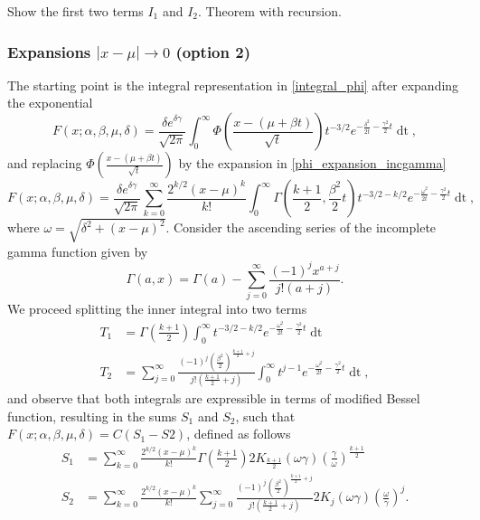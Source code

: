 \documentclass[10pt,a4paper,oneside]{article}
\numberwithin{equation}{section}
\begin{document}
Show the first two terms $I_1$ and $I_2$. Theorem with recursion.

\subsubsection{Expansions $|x-\mu| \to 0$ (option 2)}
The starting point is the integral representation in \eqref{integral_phi} after expanding the exponential
\begin{equation*}
F(x;\alpha, \beta, \mu, \delta) = \frac{\delta e^{\delta \gamma}}{\sqrt{2\pi}} \int_{0}^{\infty} \Phi\left(\frac{x - (\mu +\beta t)}{\sqrt{t}}\right) t^{-3/2} e^{-\frac{\delta^2}{2t} - \frac{\gamma^2}{2}t} \mathop{dt},
\end{equation*}
and replacing $\Phi\left(\frac{x - (\mu +\beta t)}{\sqrt{t}}\right)$ by the expansion in \eqref{phi_expansion_incgamma}
\begin{equation*}
F(x;\alpha, \beta, \mu, \delta) = \frac{\delta e^{\delta \gamma}}{\sqrt{2\pi}} \sum_{k=0}^{\infty}\frac{2^{k/2}(x-\mu)^k}{k!}\int_0^{\infty}\Gamma\left(\frac{k+1}{2}, \frac{\beta^2}{2}t\right) t^{-3/2-k/2} e^{-\frac{\omega^2}{2t} - \frac{\gamma^2}{2}t} \mathop{dt},
\end{equation*}
where $\omega = \sqrt{\delta^2 + (x-\mu)^2}$. Consider the ascending series of the incomplete gamma function given by \cite[\S 8.7]{NIST:DLMF}
\begin{equation}
\Gamma(a, x) = \Gamma(a) - \sum_{j=0}^{\infty} \frac{(-1)^j x^{a+j}}{j! (a+ j)}.
\end{equation}
We proceed splitting the inner integral into two terms
\begin{align}
T_1 &= \Gamma\left(\frac{k+1}{2}\right)\int_0^{\infty}t^{-3/2-k/2} e^{-\frac{\omega^2}{2t} - \frac{\gamma^2}{2}t} \mathop{dt}\\
T_2 &= \sum_{j=0}^{\infty} \frac{(-1)^j \left(\frac{\beta^2}{2}\right)^{\frac{k+1}{2}+j}}{j! (\frac{k+1}{2}+ j)}\int_0^{\infty} t^{j-1} e^{-\frac{\omega^2}{2t} - \frac{\gamma^2}{2}t} \mathop{dt},
\end{align}
and observe that both integrals are expressible in terms of modified Bessel function, resulting in the sums $S_1$ and $S_2$, such that $F(x;\alpha, \beta, \mu, \delta) = C (S_1 - S2)$, defined as follows
\begin{align}
S_1 &= \sum_{k=0}^{\infty}\frac{2^{k/2}(x-\mu)^k}{k!} \Gamma\left(\frac{k+1}{2}\right)2 K_{\frac{k+1}{2}}(\omega \gamma) \left(\frac{\gamma}{\omega}\right)^{\frac{k+1}{2}}\\
S_2 &= \sum_{k=0}^{\infty}\frac{2^{k/2}(x-\mu)^k}{k!}\sum_{j=0}^{\infty}\frac{(-1)^j \left(\frac{\beta^2}{2}\right)^{\frac{k+1}{2}+j}}{j! (\frac{k+1}{2}+ j)} 2 K_j(\omega \gamma) \left(\frac{\omega}{\gamma}\right)^j.
\end{align}
\end{document}
